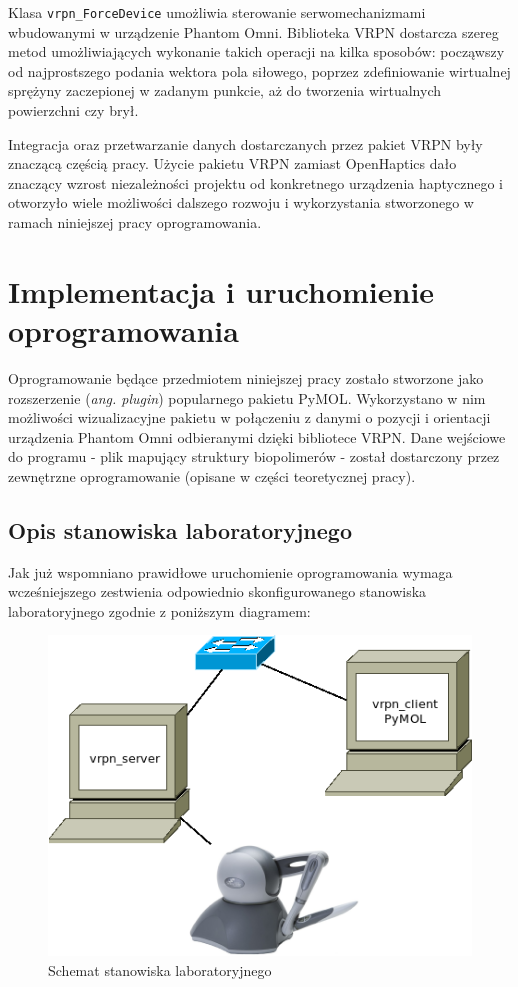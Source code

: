 \documentclass[licencjacka]{pracamgr}
\begin{document}
Klasa \texttt{vrpn\_ForceDevice} umożliwia sterowanie serwomechanizmami wbudowanymi w urządzenie Phantom Omni. Biblioteka VRPN dostarcza szereg metod umożliwiających wykonanie takich operacji na kilka sposobów: począwszy od najprostszego podania wektora pola siłowego, poprzez zdefiniowanie wirtualnej sprężyny zaczepionej w zadanym punkcie, aż do tworzenia wirtualnych powierzchni czy brył.

Integracja oraz przetwarzanie danych dostarczanych przez pakiet VRPN były znaczącą częścią pracy. Użycie pakietu VRPN zamiast OpenHaptics dało znaczący wzrost niezależności projektu od konkretnego urządzenia haptycznego i otworzyło wiele możliwości dalszego rozwoju i wykorzystania stworzonego w ramach niniejszej pracy oprogramowania. 

\chapter{Implementacja i uruchomienie oprogramowania}

Oprogramowanie będące przedmiotem niniejszej pracy zostało stworzone jako rozszerzenie (\textit{ang. plugin}) popularnego pakietu PyMOL. Wykorzystano w nim możliwości wizualizacyjne pakietu w połączeniu z danymi o pozycji i orientacji urządzenia Phantom Omni odbieranymi dzięki bibliotece VRPN. Dane wejściowe do programu - plik mapujący struktury biopolimerów - został dostarczony przez zewnętrzne oprogramowanie (opisane w części teoretycznej pracy).

\section{Opis stanowiska laboratoryjnego}
Jak już wspomniano prawidłowe uruchomienie oprogramowania wymaga wcześniejszego zestwienia odpowiednio skonfigurowanego stanowiska laboratoryjnego zgodnie z poniższym diagramem: 

\begin{figure}[H]
\centering
\includegraphics[scale=0.6,center]{stanowisko}
\caption{Schemat stanowiska laboratoryjnego}
\end{figure}
\end{document}

